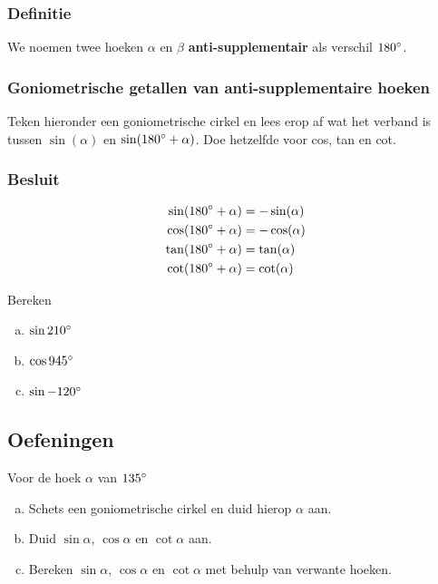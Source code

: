 \documentclass[a4paper,12pt]{article}
\begin{document}
\subsubsection*{Definitie}
We noemen twee hoeken $\alpha$ en $\beta$ \textbf{anti-supplementair} als verschil $180^\circ$.

\subsubsection*{Goniometrische getallen van anti-supplementaire hoeken}
Teken hieronder een goniometrische cirkel en lees erop af wat het verband is tussen $\sin(\alpha)$ en $\sin(180^\circ+\alpha)$. Doe hetzelfde voor cos, tan en cot.
\vspace*{6cm}

\subsubsection*{Besluit}
\begin{align*}
\sin(180^\circ+\alpha)&=-\sin(\alpha)\\
\cos(180^\circ+\alpha)&=-\cos(\alpha)\\
\tan(180^\circ+\alpha)&=\tan(\alpha)\\
\cot(180^\circ+\alpha)&=\cot(\alpha)  
\end{align*}

\begin{oefening}
Bereken
\begin{enumerate}[(a)]
  \item $\sin210^\circ$
  \item $\cos945^\circ$
  \item $\sin-120^\circ$
\end{enumerate}
\end{oefening}

\pagebreak
\subsection{Oefeningen}

\begin{oefening}
Voor de hoek $\alpha$ van $135^\circ$
\begin{enumerate}[(a)]
  \item Schets een goniometrische cirkel en duid hierop $\alpha$ aan.
  \item Duid $\sin \alpha$, $\cos \alpha$ en $\cot \alpha$ aan.
  \item Bereken $\sin \alpha$, $\cos \alpha$ en $\cot \alpha$ met behulp van verwante hoeken.
\end{enumerate}
\end{oefening}
\end{document}
